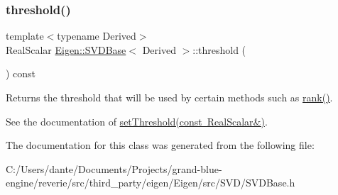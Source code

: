 \subsubsection{\texorpdfstring{threshold()}{threshold()}}
{\footnotesize\ttfamily template$<$typename Derived$>$ \\
Real\+Scalar \mbox{\hyperlink{class_eigen_1_1_s_v_d_base}{Eigen\+::\+S\+V\+D\+Base}}$<$ Derived $>$\+::threshold (\begin{DoxyParamCaption}{ }\end{DoxyParamCaption}) const\hspace{0.3cm}{\ttfamily [inline]}}

Returns the threshold that will be used by certain methods such as \mbox{\hyperlink{class_eigen_1_1_s_v_d_base_a30b89e24f42f1692079eea31b361d26a}{rank()}}.

See the documentation of \mbox{\hyperlink{class_eigen_1_1_s_v_d_base_a1c95d05398fc15e410a28560ef70a5a6}{set\+Threshold(const Real\+Scalar\&)}}. 

The documentation for this class was generated from the following file\+:\begin{DoxyCompactItemize}
\item 
C\+:/\+Users/dante/\+Documents/\+Projects/grand-\/blue-\/engine/reverie/src/third\+\_\+party/eigen/\+Eigen/src/\+S\+V\+D/S\+V\+D\+Base.\+h\end{DoxyCompactItemize}

